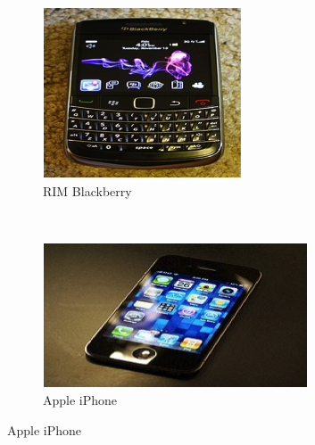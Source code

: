 \begin{figure}[htb]
        \centering
        \begin{subfigure}[b]{0.3\textwidth}
                \includegraphics[width=\textwidth]{images/rim-blackberry}
                \caption{RIM Blackberry}
                \label{fig:rim-blackberry}
        \end{subfigure}%
        ~ %
        \begin{subfigure}[b]{0.3\textwidth}
                \includegraphics[width=\textwidth]{images/apple-iphone}
                \caption{Apple iPhone}
                \label{fig:apple-iPhone}
        \end{subfigure}

\end{figure}
